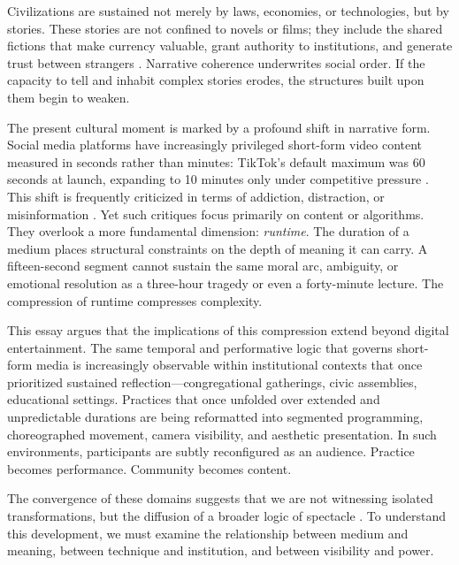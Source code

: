 \documentclass[12pt]{article}
\theoremstyle{definition}
\theoremstyle{plain}
\begin{document}
Civilizations are sustained not merely by laws, economies, or technologies, but by stories. These stories are not confined to novels or films; they include the shared fictions that make currency valuable, grant authority to institutions, and generate trust between strangers \citep{Harari2015}. Narrative coherence underwrites social order. If the capacity to tell and inhabit complex stories erodes, the structures built upon them begin to weaken.

The present cultural moment is marked by a profound shift in narrative form. Social media platforms have increasingly privileged short-form video content measured in seconds rather than minutes: TikTok's default maximum was 60 seconds at launch, expanding to 10 minutes only under competitive pressure \citep{Herrman2019}. This shift is frequently criticized in terms of addiction, distraction, or misinformation \citep{Twenge2017,Haidt2023}. Yet such critiques focus primarily on content or algorithms. They overlook a more fundamental dimension: \emph{runtime}. The duration of a medium places structural constraints on the depth of meaning it can carry. A fifteen-second segment cannot sustain the same moral arc, ambiguity, or emotional resolution as a three-hour tragedy or even a forty-minute lecture. The compression of runtime compresses complexity.

This essay argues that the implications of this compression extend beyond digital entertainment. The same temporal and performative logic that governs short-form media is increasingly observable within institutional contexts that once prioritized sustained reflection---congregational gatherings, civic assemblies, educational settings. Practices that once unfolded over extended and unpredictable durations are being reformatted into segmented programming, choreographed movement, camera visibility, and aesthetic presentation. In such environments, participants are subtly reconfigured as an audience. Practice becomes performance. Community becomes content.

The convergence of these domains suggests that we are not witnessing isolated transformations, but the diffusion of a broader logic of spectacle \citep{Debord1994}. To understand this development, we must examine the relationship between medium and meaning, between technique and institution, and between visibility and power.
\end{document}
